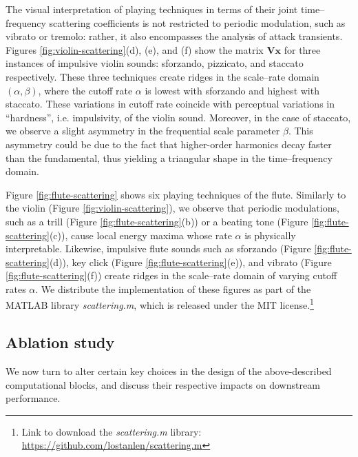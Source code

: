 \documentclass{bmcart}
\begin{document}
The visual interpretation of playing techniques in terms of their joint time--frequency scattering coefficients is not restricted to periodic modulation, such as vibrato or tremolo: rather, it also encompasses the analysis of attack transients.
Figures \ref{fig:violin-scattering}(d), (e), and (f) show the matrix $\mathbf{V}\boldsymbol{x}$ for three instances of impulsive violin sounds: sforzando, pizzicato, and staccato respectively.
These three techniques create ridges in the scale--rate domain $(\alpha, \beta)$, where the cutoff rate $\alpha$ is lowest with sforzando and highest with staccato.
These variations in cutoff rate coincide with perceptual variations in ``hardness'', i.e. impulsivity, of the violin sound.
Moreover, in the case of staccato, we observe a slight asymmetry in the frequential scale parameter $\beta$.
This asymmetry could be due to the fact that higher-order harmonics decay faster than the fundamental, thus yielding a triangular shape in the time--frequency domain.

Figure \ref{fig:flute-scattering} shows six playing techniques of the flute.
Similarly to the violin (Figure \ref{fig:violin-scattering}), we observe that periodic modulations, such as a trill (Figure \ref{fig:flute-scattering}(b)) or a beating tone (Figure \ref{fig:flute-scattering}(c)), cause local energy maxima whose rate $\alpha$ is physically interpretable.
Likewise, impulsive flute sounds such as sforzando (Figure \ref{fig:flute-scattering}(d)), key click (Figure \ref{fig:flute-scattering}(e)), and vibrato (Figure \ref{fig:flute-scattering}(f)) create ridges in the scale--rate domain of varying cutoff rates $\alpha$.
We distribute the implementation of these figures as part of the MATLAB library \emph{scattering.m}, which is released under the MIT license.\footnote{Link to download the \emph{scattering.m} library: \url{https://github.com/lostanlen/scattering.m}}



\subsection*{Ablation study}
We now turn to alter certain key choices in the design of the above-described computational blocks, and discuss their respective impacts on downstream performance.
\end{document}
